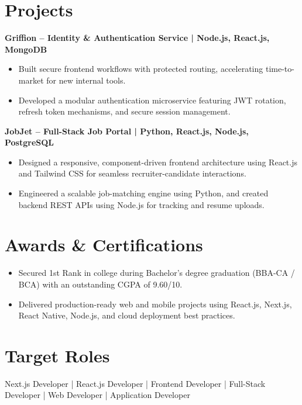 \documentclass[a4paper,10pt]{article}
\begin{document}
\section*{Projects}

\textbf{Griffion -- Identity \& Authentication Service | Node.js, React.js, MongoDB}

\begin{itemize}[leftmargin=*]
    \item Built secure frontend workflows with protected routing, accelerating time-to-market for new internal tools.
    \item Developed a modular authentication microservice featuring JWT rotation, refresh token mechanisms, and secure session management.
\end{itemize}

\textbf{JobJet -- Full-Stack Job Portal | Python, React.js, Node.js, PostgreSQL}

\begin{itemize}[leftmargin=*]
    \item Designed a responsive, component-driven frontend architecture using React.js and Tailwind CSS for seamless recruiter-candidate interactions.
    \item Engineered a scalable job-matching engine using Python, and created backend REST APIs using Node.js for tracking and resume uploads.
\end{itemize}

\section*{Awards \& Certifications}

\begin{itemize}[leftmargin=*]
    \item Secured 1st Rank in college during Bachelor's degree graduation (BBA-CA / BCA) with an outstanding CGPA of 9.60/10.
    \item Delivered production-ready web and mobile projects using React.js, Next.js, React Native, Node.js, and cloud deployment best practices.
\end{itemize}

\section*{Target Roles}

Next.js Developer | React.js Developer | Frontend Developer | Full-Stack Developer | Web Developer | Application Developer
\end{document}
